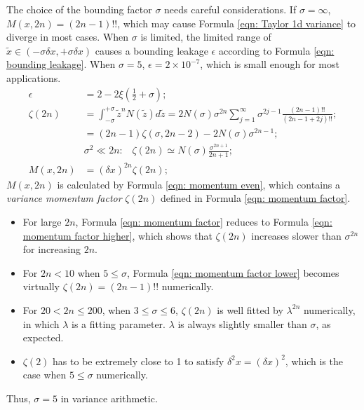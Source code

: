 \documentclass[twoside]{article}
\numberwithin{equation}{section}
\newcommand{\eqspace}{\;\;\;}
\begin{document}
The choice of the bounding factor $\sigma$ needs careful considerations.
If $\sigma = \infty$, $M(x, 2n) = (2n - 1)!!$, which may cause Formula \eqref{eqn: Taylor 1d variance} to diverge in most cases.
When $\sigma$ is limited, the limited range of $\tilde{x} \in (-\sigma \delta x, +\sigma \delta x)$ causes a bounding leakage $\epsilon$ according to Formula \eqref{eqn: bounding leakage}.
When $\sigma = 5$, $\epsilon = 2 \times 10^{-7}$, which is small enough for most applications.
\begin{align}
\label{eqn: bounding leakage}
\epsilon &= 2 - 2 \xi(\frac{1}{2} + \sigma); \\
\label{eqn: momentum factor} 
\zeta(2n) &= \int_{-\sigma}^{+\sigma} \tilde{z}^n N(\tilde{z}) d \tilde{z}
  = 2 N(\sigma) \sigma^{2n} \sum_{j=1}^{\infty} \sigma^{2j-1} \frac{(2n - 1)!!}{(2n-1 + 2j)!!}; \\
\label{eqn: momentum factor lower} 
 &= (2n - 1) \zeta(\sigma, 2n - 2) - 2 N(\sigma) \sigma^{2n - 1}; \\
\label{eqn: momentum factor higher} 
&\sigma^2 \ll 2n:\eqspace \zeta(2n) \simeq N(\sigma) \frac{\sigma^{2n+1}}{2n+1}; \\
\label{eqn: momentum even} 
M(x, 2n) &= (\delta x)^{2n} \zeta(2n);
\end{align}
$M(x, 2n)$ is calculated by Formula \eqref{eqn: momentum even}, which contains a \emph{variance momentum factor} $\zeta(2n)$ defined in Formula \eqref{eqn: momentum factor}.
\begin{itemize}
\item For large $2n$, Formula \eqref{eqn: momentum factor} reduces to Formula \eqref{eqn: momentum factor higher}, which shows that $\zeta(2n)$ increases slower than $\sigma^{2n}$ for increasing $2n$.

\item For $2n < 10$ when $5 \leq \sigma$, Formula \eqref{eqn: momentum factor lower} becomes virtually $\zeta(2n) = (2n-1)!!$ numerically.  

\item For $20 < 2n \leq 200$, when $3 \leq \sigma \leq 6$, $\zeta(2n)$ is well fitted by $\lambda^{2n}$ numerically, in which $\lambda$ is a fitting parameter. 
$\lambda$ is always slightly smaller than $\sigma$, as expected.

\item $\zeta(2)$ has to be extremely close to 1 to satisfy $\delta^2 x = (\delta x)^2$, which is the case when $5 \leq \sigma$ numerically.
\end{itemize}
Thus, $\sigma = 5$ in variance arithmetic.
\end{document}
